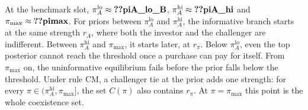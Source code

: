 At the benchmark slot, \(\pi_A^{\mathrm{lo}}\approx\reg{piA_lo_B}\), \(\pi_A^{\mathrm{hi}}\approx\reg{piA_hi}\) and
\(\pi_{\max}\approx\reg{pimax}\). For priors between \(\pi_A^{\mathrm{lo}}\) and \(\pi_A^{\mathrm{hi}}\), the
informative branch starts at the same strength \(r_A\), where both the investor and the challenger are indifferent.
Between \(\pi_A^{\mathrm{hi}}\) and \(\pi_{\max}\), it starts later, at \(r_\pi\). Below \(\pi_A^{\mathrm{lo}}\), even the
top posterior cannot reach the threshold once a purchase can pay for itself. From \(\pi_{\max}\) on, the
uninformative equilibrium fails before the prior falls below the threshold. Under rule CM, a challenger tie at the prior adds one strength: for every
\(\pi\in(\pi_A^{\mathrm{hi}},\pi_{\max}]\), the set \(C(\pi)\) also contains \(r_\pi\). At \(\pi=\pi_{\max}\) this
point is the whole coexistence set.

